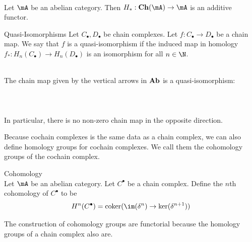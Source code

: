 \documentclass[a4paper]{article}
\begin{document}
\begin{lmm}{}{}\\
Let $\mA$ be an abelian category. Then $H_\ast:\bold{Ch}(\mA)\to\mA$ is an additive functor. 
\end{lmm}

\begin{defn}{Quasi-Isomorphisms}{} Let $C_\bullet,D_\bullet$ be chain complexes. Let $f:C_\bullet\to D_\bullet$ be a chain map. We say that $f$ is a quasi-isomorphism if the induced map in homology $f_\ast:H_n(C_\bullet)\to H_n(D_\bullet)$ is an isomorphism for all $n\in\N$. 
\end{defn}

\begin{eg}{}{}\\
The chain map given by the vertical arrows in $\bold{Ab}$ is a quasi-isomorphism: \\~\\
\\~\\
In particular, there is no non-zero chain map in the opposite direction. 
\end{eg}

Because cochain complexes is the same data as a chain complex, we can also define homology groups for cochain complexes. We call them the cohomology groups of the cochain complex. 

\begin{defn}{Cohomology}{}\\
Let $\mA$ be an abelian category. Let $C^\bullet$ be a chain complex. Define the $n$th cohomology of $C^\bullet$ to be $$H^n(C^\bullet)=\text{coker}(\im(\delta^n)\to\ker(\delta^{n+1}))$$
\end{defn}

The construction of cohomology groups are functorial because the homology groups of a chain complex also are. 
\end{document}
